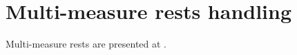 



\chapter{Multi-measure rests handling}\label{Multi-measure rests handling}

Multi-measure rests are presented at .


